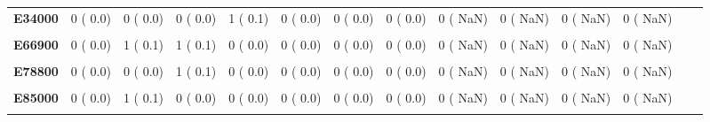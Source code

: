 \documentclass[
]{article}
\begin{document}
\begin{table}[H]
\begin{tabular}[t]{>{\raggedright\arraybackslash}p{5em}ccccccccccccc}
\textbf{E34000} & 0 (  0.0) & 0 (  0.0) & 0 (  0.0) & 1 (  0.1) & 0 (  0.0) & 0 (  0.0) & 0 (  0.0) & 0 (  NaN) & 0 (  NaN) & 0 (  NaN) & 0 (  NaN) &  & \\
\textbf{\cellcolor{gray!10}{E66800}} & \cellcolor{gray!10}{0 (  0.0)} & \cellcolor{gray!10}{0 (  0.0)} & \cellcolor{gray!10}{0 (  0.0)} & \cellcolor{gray!10}{1 (  0.1)} & \cellcolor{gray!10}{0 (  0.0)} & \cellcolor{gray!10}{0 (  0.0)} & \cellcolor{gray!10}{0 (  0.0)} & \cellcolor{gray!10}{0 (  NaN)} & \cellcolor{gray!10}{0 (  NaN)} & \cellcolor{gray!10}{0 (  NaN)} & \cellcolor{gray!10}{0 (  NaN)} & \cellcolor{gray!10}{} & \cellcolor{gray!10}{}\\
\textbf{E66900} & 0 (  0.0) & 1 (  0.1) & 1 (  0.1) & 0 (  0.0) & 0 (  0.0) & 0 (  0.0) & 0 (  0.0) & 0 (  NaN) & 0 (  NaN) & 0 (  NaN) & 0 (  NaN) &  & \\
\textbf{\cellcolor{gray!10}{E78500}} & \cellcolor{gray!10}{0 (  0.0)} & \cellcolor{gray!10}{2 (  0.2)} & \cellcolor{gray!10}{1 (  0.1)} & \cellcolor{gray!10}{3 (  0.4)} & \cellcolor{gray!10}{1 (  0.2)} & \cellcolor{gray!10}{0 (  0.0)} & \cellcolor{gray!10}{0 (  0.0)} & \cellcolor{gray!10}{0 (  NaN)} & \cellcolor{gray!10}{0 (  NaN)} & \cellcolor{gray!10}{0 (  NaN)} & \cellcolor{gray!10}{0 (  NaN)} & \cellcolor{gray!10}{} & \cellcolor{gray!10}{}\\
\textbf{E78800} & 0 (  0.0) & 0 (  0.0) & 1 (  0.1) & 0 (  0.0) & 0 (  0.0) & 0 (  0.0) & 0 (  0.0) & 0 (  NaN) & 0 (  NaN) & 0 (  NaN) & 0 (  NaN) &  & \\
\textbf{\cellcolor{gray!10}{E83800}} & \cellcolor{gray!10}{0 (  0.0)} & \cellcolor{gray!10}{0 (  0.0)} & \cellcolor{gray!10}{0 (  0.0)} & \cellcolor{gray!10}{1 (  0.1)} & \cellcolor{gray!10}{0 (  0.0)} & \cellcolor{gray!10}{0 (  0.0)} & \cellcolor{gray!10}{0 (  0.0)} & \cellcolor{gray!10}{0 (  NaN)} & \cellcolor{gray!10}{0 (  NaN)} & \cellcolor{gray!10}{0 (  NaN)} & \cellcolor{gray!10}{0 (  NaN)} & \cellcolor{gray!10}{} & \cellcolor{gray!10}{}\\
\textbf{E85000} & 0 (  0.0) & 1 (  0.1) & 0 (  0.0) & 0 (  0.0) & 0 (  0.0) & 0 (  0.0) & 0 (  0.0) & 0 (  NaN) & 0 (  NaN) & 0 (  NaN) & 0 (  NaN) &  & \\
\textbf{\cellcolor{gray!10}{E85900}} & \cellcolor{gray!10}{1 (  0.1)} & \cellcolor{gray!10}{2 (  0.2)} & \cellcolor{gray!10}{0 (  0.0)} & \cellcolor{gray!10}{0 (  0.0)} & \cellcolor{gray!10}{0 (  0.0)} & \cellcolor{gray!10}{0 (  0.0)} & \cellcolor{gray!10}{0 (  0.0)} & \cellcolor{gray!10}{0 (  NaN)} & \cellcolor{gray!10}{0 (  NaN)} & \cellcolor{gray!10}{0 (  NaN)} & \cellcolor{gray!10}{0 (  NaN)} & \cellcolor{gray!10}{} & \cellcolor{gray!10}{}\\

\end{tabular}
\end{table}
\end{document}
